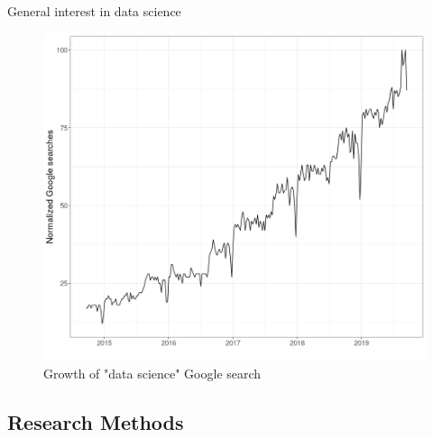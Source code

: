 \begin{frame}{General interest in data science}
    \begin{figure}
    \includegraphics[width = .8\framewidth]{png/ds-searches.png}
    \caption{Growth of "data science" Google search}
    \end{figure}
\end{frame}

\subsection{Research Methods}

